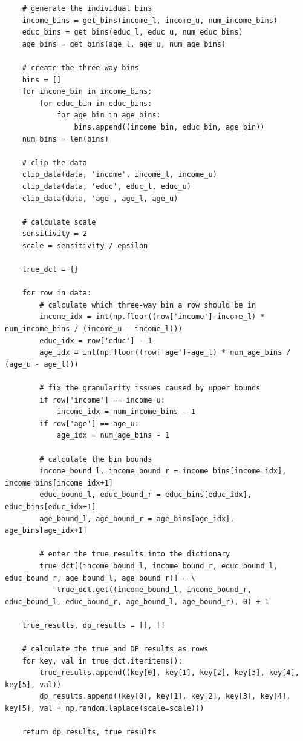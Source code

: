 \documentclass[12pt]{article}
\begin{document}
\begin{appendices}
\begin{lstlisting}
    # generate the individual bins
    income_bins = get_bins(income_l, income_u, num_income_bins)
    educ_bins = get_bins(educ_l, educ_u, num_educ_bins)
    age_bins = get_bins(age_l, age_u, num_age_bins)

    # create the three-way bins
    bins = []
    for income_bin in income_bins:
        for educ_bin in educ_bins:
            for age_bin in age_bins:
                bins.append((income_bin, educ_bin, age_bin))
    num_bins = len(bins)

    # clip the data
    clip_data(data, 'income', income_l, income_u)
    clip_data(data, 'educ', educ_l, educ_u)
    clip_data(data, 'age', age_l, age_u)

    # calculate scale
    sensitivity = 2
    scale = sensitivity / epsilon

    true_dct = {}

    for row in data:
        # calculate which three-way bin a row should be in
        income_idx = int(np.floor((row['income']-income_l) * num_income_bins / (income_u - income_l)))
        educ_idx = row['educ'] - 1
        age_idx = int(np.floor((row['age']-age_l) * num_age_bins / (age_u - age_l)))

        # fix the granularity issues caused by upper bounds
        if row['income'] == income_u:
            income_idx = num_income_bins - 1
        if row['age'] == age_u:
            age_idx = num_age_bins - 1

        # calculate the bin bounds
        income_bound_l, income_bound_r = income_bins[income_idx], income_bins[income_idx+1]
        educ_bound_l, educ_bound_r = educ_bins[educ_idx], educ_bins[educ_idx+1]
        age_bound_l, age_bound_r = age_bins[age_idx], age_bins[age_idx+1]

        # enter the true results into the dictionary
        true_dct[(income_bound_l, income_bound_r, educ_bound_l, educ_bound_r, age_bound_l, age_bound_r)] = \
            true_dct.get((income_bound_l, income_bound_r, educ_bound_l, educ_bound_r, age_bound_l, age_bound_r), 0) + 1

    true_results, dp_results = [], []

    # calculate the true and DP results as rows
    for key, val in true_dct.iteritems():
        true_results.append((key[0], key[1], key[2], key[3], key[4], key[5], val))
        dp_results.append((key[0], key[1], key[2], key[3], key[4], key[5], val + np.random.laplace(scale=scale)))

    return dp_results, true_results


\end{lstlisting}
\end{appendices}
\end{document}
